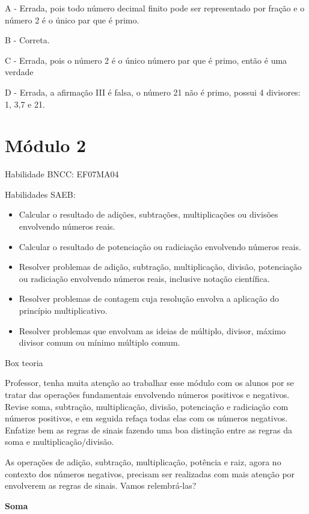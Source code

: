 A - Errada, pois todo número decimal finito pode ser representado por
fração e o número 2 é o único par que é primo.

B - Correta.

C - Errada, pois o número 2 é o único número par que é primo, então é
uma verdade

D - Errada, a afirmação III é falsa, o número 21 não é primo, possui 4
divisores: 1, 3,7 e 21.

\hypertarget{muxf3dulo-2}{%
\section{Módulo 2}\label{muxf3dulo-2}}

Habilidade BNCC: EF07MA04

Habilidades SAEB:

\begin{itemize}
\item
  Calcular o resultado de adições, subtrações, multiplicações ou
  divisões envolvendo números reais.
\item
  Calcular o resultado de potenciação ou radiciação envolvendo números
  reais.
\item
  Resolver problemas de adição, subtração, multiplicação, divisão,
  potenciação ou radiciação envolvendo números reais, inclusive notação
  científica.
\item
  Resolver problemas de contagem cuja resolução envolva a aplicação do
  princípio multiplicativo.
\item
  Resolver problemas que envolvam as ideias de múltiplo, divisor, máximo
  divisor comum ou mínimo múltiplo comum.
\end{itemize}

Box teoria

Professor, tenha muita atenção ao trabalhar esse módulo com os alunos
por se tratar das operações fundamentais envolvendo números positivos e
negativos. Revise soma, subtração, multiplicação, divisão, potenciação e
radiciação com números positivos, e em seguida refaça todas elas com os
números negativos. Enfatize bem as regras de sinais fazendo uma boa
distinção entre as regras da soma e multiplicação/divisão.

As operações de adição, subtração, multiplicação, potência e raiz, agora
no contexto dos números negativos, precisam ser realizadas com mais
atenção por envolverem as regras de sinais. Vamos relembrá-las?

\textbf{Soma}

